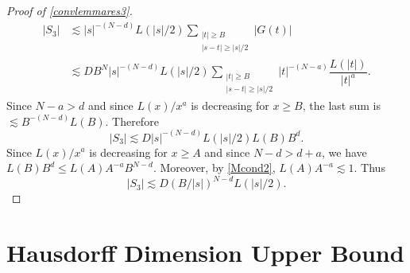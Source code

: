 \documentclass{amsart}
\numberwithin{equation}{section}
\theoremstyle{definition}
\theoremstyle{definition}
\begin{document}
\begin{proof}[Proof of \eqref{convlemmares3}]
\begin{align*} 
|S_3| 
&\lesssim 
|s|^{-(N - d)} L(|s|/2) \sum_{\substack{|t| \geq B \\ |s - t| \geq |s|/2}} |G(t)| \\
&\lesssim 
D B^N |s|^{-(N - d)} L(|s|/2) \sum_{\substack{|t| \geq B \\ |s - t| \geq |s|/2}}  |t|^{-(N-a)} \dfrac{L(|t|)}{|t|^a}. 
\end{align*}
Since $N-a>d$ and since $L(x)/x^a$ is decreasing for $x \geq B$, the last sum is $\lesssim B^{-(N-d)}L(B)$. Therefore 
$$
|S_3| 
\lesssim 
D |s|^{-(N - d)} L(|s|/2) L(B) B^d. 
$$
Since $L(x)/x^a$ is decreasing for $x \geq A$ and since $N-d>d+a$, we have 
$L(B) B^d \leq L(A)A^{-a}B^{N-d}$. 
Moreover, by \eqref{Mcond2}, $L(A) A^{-a} \lesssim 1$. 
Thus 
$$|S_3| \lesssim D (B/|s|)^{N-d} L(|s|/2).$$
\end{proof}









\section{Hausdorff Dimension Upper Bound}\label{Hausdorff Dimension Upper Bound section}
\end{document}
